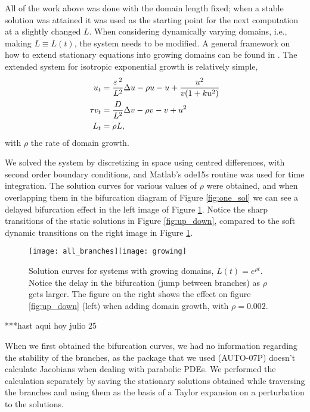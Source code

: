 All of the work above was done with the domain length fixed; when a stable solution was attained it was used as the starting point for the next computation at a slightly changed $L$. When considering dynamically varying domains, i.e., making $L\equiv L(t)$, the system needs to be modified. A general framework on how to extend stationary equations into growing domains can be found in \cite{plaza2004growth}. The extended system for isotropic exponential growth is relatively simple, 
% 
\begin{equation*}
\label{eqn:gms_growth}
\begin{split}
\begin{aligned}
	u_t &= \frac{\varepsilon\,^2}{L^2}\Delta u -\rho u - u +\frac{u^2}{v(1+ku^2)} \\
	\tau v_t &= \frac{D}{L^2}\Delta v - \rho v - v + u^2 \\
	L_t &= \rho L,
\end{aligned}
\end{split}
\end{equation*}
% 
with $\rho$ the rate of domain growth. 

We solved the system by discretizing in space using centred differences, with second order boundary conditions, and Matlab's ode15s routine was used for time integration. The solution curves for various values of $\rho$ were obtained, and when overlapping them in the bifurcation diagram of Figure \ref{fig:one_sol} we can see a delayed bifurcation effect in the left image of Figure \ref{fig:growth}. Notice the sharp transitions of the static solutions in Figure \ref{fig:up_down}, compared to the soft dynamic transitions on the right image in Figure \ref{fig:growth}. 
% 
\begin{figure}[htb]
\begin{center}
\texttt{[image: all\_branches]}\texttt{[image: growing]}
\caption{Solution curves for systems with growing domains, $L(t)=e^{\rho t}$. Notice the delay in the bifurcation (jump between branches) as $\rho$ gets larger. The figure on the right shows the effect on figure \ref{fig:up_down} (left) when adding domain growth, with $\rho=0.002$.}
\label{fig:growth}
\end{center}
\end{figure}
% 

***hast aqui hoy julio 25

When we first obtained the bifurcation curves, we had no information regarding the stability of the branches, as the package that we used (AUTO-07P) doesn't calculate Jacobians when dealing with parabolic PDEs. We performed the calculation separately by saving the stationary solutions obtained while traversing the branches and using them as the basis of a Taylor expansion on a perturbation to the solutions.

